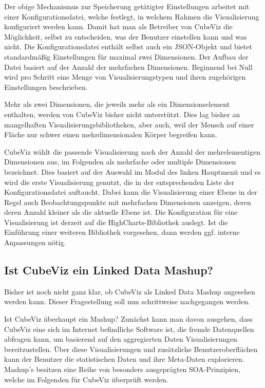 \documentclass[11pt]{article}
\begin{document}
Der obige Mechanismus zur Speicherung getätigter Einstellungen arbeitet mit einer Konfigurationsdatei, welche festlegt, in welchem Rahmen die Visualisierung konfiguriert werden kann. Damit hat man als Betreiber von CubeViz die Möglichkeit, selbst zu entscheiden, was der Benutzer einstellen kann und was nicht. Die Konfigurationsdatei enthält selbst auch ein JSON-Objekt und bietet standardmäßig Einstellungen für maximal zwei Dimensionen. Der Aufbau der Datei basiert auf der Anzahl der mehrfachen Dimensionen. Beginnend bei Null wird pro Schritt eine Menge von Visualisierungstypen und ihren zugehörigen Einstellungen beschrieben.

Mehr als zwei Dimensionen, die jeweils mehr als ein Dimensionselement enthalten, werden von CubeViz bisher nicht unterstützt. Dies lag bisher an mangelhaften Visualisierungsbibliotheken, aber auch, weil der Mensch auf einer Fläche nur schwer einen mehrdimensionalen Körper begreifen kann.

CubeViz wählt die passende Visualisierung nach der Anzahl der mehrelementigen Dimensionen aus, im Folgenden als mehrfache oder multiple Dimensionen bezeichnet. Dies basiert auf der Auswahl im Modul des linken Hauptmenü und es wird die erste Visualisierung genutzt, die in der entsprechenden Liste der Konfigurationsdatei auftaucht. Dabei kann die Visualisierung einer Ebene in der Regel auch Beobachtungspunkte mit mehrfachen Dimensionen anzeigen, deren deren Anzahl kleiner als die aktuelle Ebene ist. Die Konfiguration für eine Visualisierung ist derzeit auf die HighCharts-Bibliothek auslegt. Ist die Einführung einer weiteren Bibliothek vorgesehen, dann werden ggf. interne Anpassungen nötig. 


%
%
\subsection{Ist CubeViz ein Linked Data Mashup?}
\label{sec:chapterCubeVizAsLinkedDataMashup}

Bisher ist noch nicht ganz klar, ob CubeViz als Linked Data Mashup angesehen werden kann. Dieser Fragestellung soll nun schrittweise nachgegangen werden. 

Ist CubeViz überhaupt ein Mashup? Zunächst kann man davon ausgehen, dass CubeViz eine sich im Internet befindliche Software ist, die fremde Datenquellen abfragen kann, um basierend auf den aggregierten Daten Visualisierungen bereitzustellen. Über diese Visualisierungen und zusätzliche Benutzeroberflächen kann der Benutzer die statistischen Daten und ihre Meta-Daten explorieren. Mashup's besitzen eine Reihe von besonders ausgeprägten SOA-Prinzipien, welche im Folgenden für CubeViz überprüft werden. 
\end{document}
